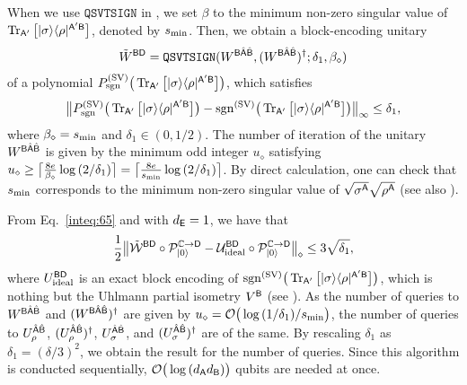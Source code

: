 When we use $\mathtt{QSVTSIGN}$ in , we set $\beta$ to the minimum non-zero singular value of $\operatorname{Tr}_{{\mathsf{A}}'}\big[|\sigma\rangle\langle\rho|^{{\mathsf{A}}'{\mathsf{B}}}\big]$, denoted by $s_{\rm min}$.
Then, we obtain a block-encoding unitary 
\begin{align}
    \tilde{W}^{{\mathsf{B}}{\mathsf{D}}} = \mathtt{QSVTSIGN}(W^{{\mathsf{B}}\hat{{\mathsf{A}}}\hat{{\mathsf{B}}}}, (W^{{\mathsf{B}}\hat{{\mathsf{A}}}\hat{{\mathsf{B}}}})^\dag; \delta_1, \beta_\diamond)    
\end{align}
of a polynomial $P_{\mathrm{sgn}}^{(\rm SV)}\big(\operatorname{Tr}_{{\mathsf{A}}'}\big[|\sigma\rangle\langle\rho|^{{\mathsf{A}}'{\mathsf{B}}}\big]\big)$, which satisfies  
\begin{align}
\label{inteq:65}
    \big\|P_{\mathrm{sgn}}^{(\rm SV)}\big(\operatorname{Tr}_{{\mathsf{A}}'}\big[|\sigma\rangle\langle\rho|^{{\mathsf{A}}'{\mathsf{B}}}\big]\big) - \mathrm{sgn}^{(\rm SV)}\big(\operatorname{Tr}_{{\mathsf{A}}'}\big[|\sigma\rangle\langle\rho|^{{\mathsf{A}}'{\mathsf{B}}}\big]\big)\big\|_\infty \leq \delta_1,
\end{align}
where $\beta_\diamond = s_{\rm min}$ and $\delta_1 \in (0, 1/2)$.
The number of iteration of the unitary $W^{{\mathsf{B}}\hat{{\mathsf{A}}}\hat{{\mathsf{B}}}}$ is given by the minimum odd integer $u_\diamond$ satisfying $u_\diamond \geq \big\lceil\frac{8e}{\beta_\diamond}\log{(2/\delta_1)}\big\rceil = \big\lceil\frac{8e}{s_{\rm min}}\log{(2/\delta_1)}\big\rceil$.
By direct calculation, one can check that $s_{\rm min}$ corresponds to the minimum non-zero singular value of $\sqrt{\sigma^{\mathsf{A}}}\sqrt{\rho^{\mathsf{A}}}$ (see also ).

From Eq.~\eqref{inteq:65} and  with $d_{\mathsf{E}} = 1$, we have that
\begin{align}
    \frac{1}{2}\big\|\tilde{{\mathcal{W}}}^{{\mathsf{B}}{\mathsf{D}}}\circ{\mathcal{P}}_{|0\rangle}^{\mathbb{C}\rightarrow{\mathsf{D}}} - {\mathcal{U}}_{\rm ideal}^{{\mathsf{B}}{\mathsf{D}}}\circ {\mathcal{P}}_{|0\rangle}^{\mathbb{C}\rightarrow{\mathsf{D}}}\big\|_\diamond \leq 3\sqrt{\delta_1},
\end{align}
where $U_{\rm ideal}^{{\mathsf{B}}{\mathsf{D}}}$ is an exact block encoding of $\mathrm{sgn}^{(\rm SV)}\big(\operatorname{Tr}_{{\mathsf{A}}'}\big[|\sigma\rangle\langle\rho|^{{\mathsf{A}}'{\mathsf{B}}}\big]\big)$, which is nothing but the Uhlmann partial isometry $V^{\mathsf{B}}$ (see ).
As the number of queries to $W^{{\mathsf{B}}\hat{{\mathsf{A}}}\hat{{\mathsf{B}}}}$ and $(W^{{\mathsf{B}}\hat{{\mathsf{A}}}\hat{{\mathsf{B}}}})^\dag$ are given by $u_\diamond = {\mathcal{O}}\big(\log{(1/\delta_1)}/s_{\rm min}\big)$, the number of queries to $U_\rho^{\hat{{\mathsf{A}}}\hat{{\mathsf{B}}}}$, $(U_\rho^{\hat{{\mathsf{A}}}\hat{{\mathsf{B}}}})^\dag$, $U_\sigma^{\hat{{\mathsf{A}}}\hat{{\mathsf{B}}}}$, and $(U_\sigma^{\hat{{\mathsf{A}}}\hat{{\mathsf{B}}}})^\dag$ are of the same.
By rescaling $\delta_1$ as $\delta_1 = (\delta/3)^2$, we obtain the result for the number of queries.
Since this algorithm is conducted sequentially, ${\mathcal{O}}\big(\log{(d_{\mathsf{A}}d_{\mathsf{B}})}\big)$ qubits are needed at once.









